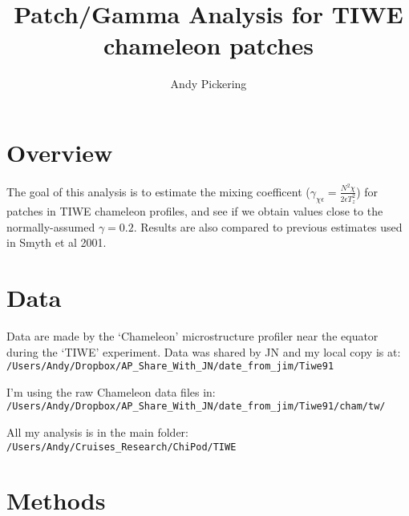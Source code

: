\documentclass[11pt]{article}
\title{Patch/Gamma Analysis for TIWE chameleon patches}
\author{Andy Pickering}
\begin{document}
\maketitle

\tableofcontents
\newpage

\section{Overview}

The goal of this analysis is to estimate the mixing coefficent ($\gamma_{\chi\epsilon}=\frac{N^2 \chi}{2\epsilon T_{z}^{2}} $) for patches in TIWE chameleon profiles, and see if we obtain values close to the normally-assumed $\gamma=0.2$. Results are also compared to previous estimates used in Smyth et al 2001.

\section{Data}

Data are made by the `Chameleon' microstructure profiler near the equator during the `TIWE' experiment. Data was shared by JN and my local copy is at: \newline \verb+/Users/Andy/Dropbox/AP_Share_With_JN/date_from_jim/Tiwe91+

\medskip

I'm using the raw Chameleon data files in: \newline
\verb+/Users/Andy/Dropbox/AP_Share_With_JN/date_from_jim/Tiwe91/cham/tw/+

\medskip

All my analysis is in the main folder: \newline  \verb+/Users/Andy/Cruises_Research/ChiPod/TIWE+


\section{Methods}
\end{document}
